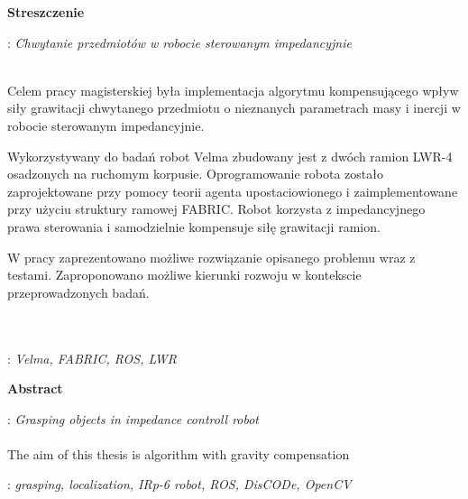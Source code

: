 


\clearpage\mbox{}\thispagestyle{empty}\newpage




%

\clearpage\mbox{}\newpage



\vspace*{\baselineskip}
\begin{center}
	{\large\bfseries Streszczenie}\par\bigskip
\end{center}
: {\itshape Chwytanie przedmiotów w robocie sterowanym impedancyjnie}
\\\\
{
	Celem pracy magisterskiej była implementacja algorytmu kompensującego wpływ siły grawitacji chwytanego przedmiotu o nieznanych parametrach masy i inercji w robocie sterowanym impedancyjnie.
	
	Wykorzystywany do badań robot Velma zbudowany jest z dwóch ramion LWR-4 osadzonych na ruchomym korpusie. Oprogramowanie robota zostało zaprojektowane przy pomocy teorii agenta upostaciowionego i zaimplementowane przy użyciu struktury ramowej FABRIC. Robot korzysta z impedancyjnego prawa sterowania i samodzielnie kompensuje siłę grawitacji ramion. 
	
	W pracy zaprezentowano możliwe rozwiązanie opisanego problemu wraz z testami. Zaproponowano możliwe kierunki rozwoju w kontekscie przeprowadzonych badań.
}\\\\
\vspace*{0.6\baselineskip}
: {\itshape Velma, FABRIC, ROS, LWR}

\clearpage\mbox{}\newpage


\vspace*{\baselineskip}
\begin{center}
	{\large\bfseries Abstract}\par\bigskip
\end{center}
: {\itshape Grasping objects in impedance controll robot}
\\\\
{ 
	The aim of this thesis is algorithm with gravity compensation 
}\par
\vspace*{1\baselineskip}
: {\itshape grasping, localization, IRp-6 robot, ROS, DisCODe, OpenCV}

\clearpage\mbox{}\newpage



\clearpage\mbox{}\newpage




